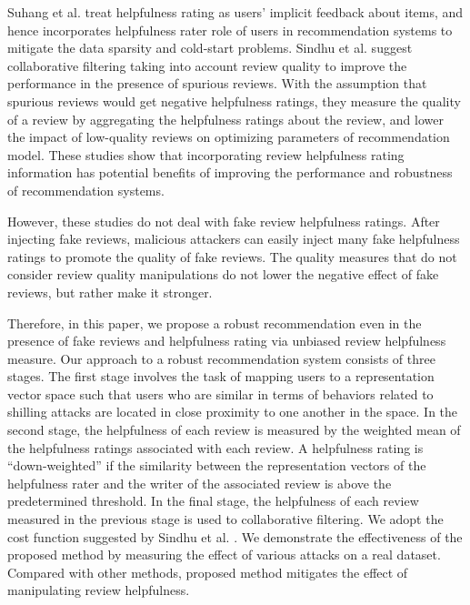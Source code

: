 \documentclass[master,english,final]{kaist-ucs}
\begin{document}
Suhang et al. \cite{DualRole} treat helpfulness rating as users’ implicit feedback about items, and hence incorporates helpfulness rater role of users in recommendation systems to mitigate the data sparsity and cold-start problems.
Sindhu et al. \cite{RQMF} suggest collaborative filtering taking into account review quality to improve the performance in the presence of spurious reviews.
With the assumption that spurious reviews would get negative helpfulness ratings, they measure the quality of a review by aggregating the helpfulness ratings about the review, and lower the impact of low-quality reviews on optimizing parameters of recommendation model.
These studies show that incorporating review helpfulness rating information has potential benefits of improving the performance and robustness of recommendation systems.

However, these studies do not deal with fake review helpfulness ratings.
After injecting fake reviews, malicious attackers can easily inject many fake helpfulness ratings to promote the quality of fake reviews.
The quality measures that do not consider review quality manipulations do not lower the negative effect of fake reviews, but rather make it stronger.

Therefore, in this paper, we propose a robust recommendation even in the presence of fake reviews and helpfulness rating via unbiased review helpfulness measure.
Our approach to a robust recommendation system consists of three stages.
The first stage involves the task of mapping users to a representation vector space such that users who are similar in terms of behaviors related to shilling attacks are located in close proximity to one another in the space.
In the second stage, the helpfulness of each review is measured by the weighted mean of the helpfulness ratings associated with each review.
A helpfulness rating is “down-weighted” if the similarity between the representation vectors of the helpfulness rater and the writer of the associated review is above the predetermined threshold.
In the final stage, the helpfulness of each review measured in the previous stage is used to collaborative filtering.
We adopt the cost function suggested by Sindhu et al. \cite{RQMF}.
We demonstrate the effectiveness of the proposed method by measuring the effect of various attacks on a real dataset.
Compared with other methods, proposed method mitigates the effect of manipulating review helpfulness.
\end{document}
